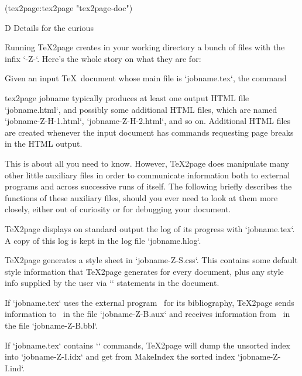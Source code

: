 {{{{{{{{{\begintts
(tex2page:tex2page "tex2page-doc")
\endtt

%
%
\fi

\beginchapter D Details for the curious

%
Running \TeX2page creates in your working directory  a bunch of files
with the infix `-Z-`.
Here’s the whole story on what they are for:

Given an input \TeX\ document whose main file is
`jobname.tex`, the
command

\begintt
tex2page jobname
\endtt
%
typically produces at least one
output HTML file `jobname.html`, and possibly some
additional HTML files, which are named
`jobname-Z-H-1.html`, `jobname-Z-H-2.html`, and
so on.  Additional HTML files are created whenever the
input document has commands requesting page
breaks in the HTML output.

This is about all you need to know.  However, \TeX2page
does manipulate many other little auxiliary files in order to
communicate information both to external programs and
across successive runs of itself.  The following
briefly describes the functions of these auxiliary
files, should you ever need to look at them more
closely, either out of curiosity or for debugging your
document.

\TeX2page displays on standard output the log of
its progress with `jobname.tex`.  A copy of this
log is kept in the log
file `jobname.hlog`.

\TeX2page generates a style sheet in
`jobname-Z-S.css`.  This contains some default style
information that \TeX2page generates for every document,
plus any style info supplied by the user via
`\cssblock` statements in the document.


If `jobname.tex` uses the external program \BibTeX\ for
its bibliography, \TeX2page sends information to \BibTeX\
in the file `jobname-Z-B.aux` and receives information
from \BibTeX\ in the file `jobname-Z-B.bbl`.


If `jobname.tex` contains `\index` commands, \TeX2page
will dump the unsorted index into `jobname-Z-I.idx` and
get from MakeIndex the sorted index `jobname-Z-I.ind`.

}}}}}}}}}
